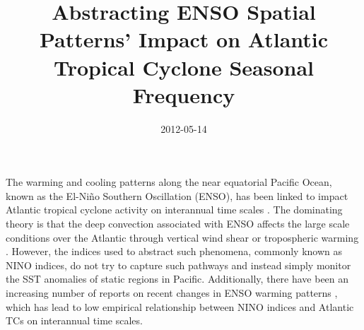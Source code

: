 \documentclass[]{article}
\title{Abstracting ENSO Spatial Patterns' Impact on Atlantic Tropical Cyclone Seasonal Frequency}
\author{  }
\date{2012-05-14}
\begin{document}
\maketitle

The warming and cooling patterns along the near equatorial Pacific Ocean, known as the El-Ni\~no Southern Oscillation (ENSO), has been linked to impact Atlantic tropical cyclone activity on interannual time scales \cite{gray1984a, bove1998,elsner2001b, emanuel2008, klotzbach2011nino}. The dominating theory is that the deep convection associated with ENSO affects the large scale conditions over the Atlantic through vertical wind shear \cite{gray1984} or tropospheric warming \cite{tang2004}. However, the indices used to abstract such phenomena, commonly known as NINO indices, do not try to capture such pathways and instead simply monitor the SST anomalies of static regions in Pacific. Additionally, there have been an increasing number of reports on recent changes in ENSO warming patterns \cite{ashok2007,yeh2009}, which has lead to low empirical relationship between NINO indices and Atlantic TCs on interannual time scales.
\end{document}
